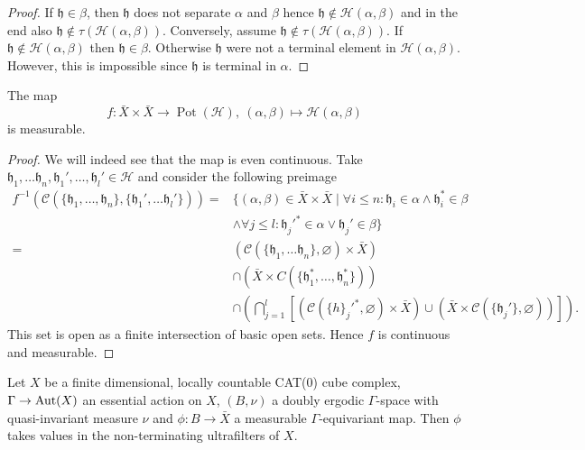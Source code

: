 \begin{proof}
  If \(\mathfrak{h} \in \beta\), then \(\mathfrak{h}\) does not separate \(\alpha\) and \(\beta\) hence \(\mathfrak{h} \notin \mathcal{H}(\alpha, \beta)\) and in the end also \(\mathfrak{h} \notin \tau(\mathcal{H}(\alpha, \beta))\). Conversely, assume \(\mathfrak{h} \notin \tau(\mathcal{H}(\alpha, \beta))\). If \(\mathfrak{h} \notin \mathcal{H}(\alpha, \beta)\) then \(\mathfrak{h} \in \beta\). Otherwise \(\mathfrak{h}\) were not a terminal element in \(\mathcal{H}(\alpha, \beta)\). However, this is impossible since \(\mathfrak{h}\) is terminal in \(\alpha\).
\end{proof}

\begin{lemma}
  The map
  \[
    f\colon \bar X \times \bar X \to \operatorname{Pot}(\mathcal{H}),\ (\alpha, \beta)\mapsto \mathcal{H}(\alpha, \beta)
  \]
  is measurable.
\end{lemma}

\begin{proof}
  We will indeed see that the map is even continuous. Take \(\mathfrak{h}_1,\dots \mathfrak{h}_n, \mathfrak{h}_1', \dots, \mathfrak{h}_l' \in \mathcal{H}\) and consider the following preimage
  \begin{align*}
    f^{-1}(\mathcal{C}(\{\mathfrak{h}_1, \dots, \mathfrak{h}_n\}, \{\mathfrak{h}_1', \dots \mathfrak{h}_l'\}))  = & \{(\alpha, \beta) \in \bar X \times \bar X \mid \forall i \leq n\colon \mathfrak{h}_i \in \alpha \wedge \mathfrak{h}_i^\ast \in \beta\\
    & \wedge \forall j \leq l \colon \mathfrak{h}_j'^\ast \in \alpha \vee \mathfrak{h}_j' \in \beta\}\\
    = & (\mathcal{C}(\{\mathfrak{h}_1, \dots \mathfrak{h}_n\}, \varnothing)  \times \bar X)\\
    & \cap (\bar X \times C(\{\mathfrak{h}_1^\ast, \dots, \mathfrak{h}_n^\ast\}))\\
                                                                                                                  & \cap \left ( \bigcap_{j=1}^l \left[(\mathcal{C}(\{h\}_j'^\ast, \varnothing) \times \bar X) \cup (\bar X \times \mathcal{C}(\{\mathfrak{h}_j'\}, \varnothing))\right]\right).
  \end{align*}
  This set is open as a finite intersection of basic open sets. Hence \(f\) is continuous and measurable.
\end{proof}

\begin{lemma}[{\cite[Lemma~4.11]{MR3509968}}]
  \label{lem:4.11}
  Let \(X\) be a finite dimensional, locally countable CAT(0) cube complex, \(\Gamma \to \operatorname{Aut}(X)\) an essential action on \(X\), \((B, \nu)\) a doubly ergodic \(\Gamma\)-space with quasi-invariant measure \(\nu\) and \(\phi\colon B \to \bar X\) a measurable \(\Gamma\)-equivariant map. Then \(\phi\) takes values in the non-terminating ultrafilters of \(X\).
\end{lemma}

